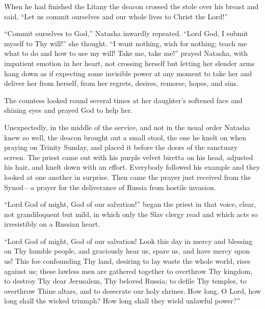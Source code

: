 When he had finished the Litany the deacon crossed the stole over
his breast and said, ``Let us commit ourselves and our whole
lives to Christ the Lord!''

``Commit ourselves to God,'' Natasha inwardly repeated. ``Lord
God, I submit myself to Thy will!'' she thought. ``I want
nothing, wish for nothing; teach me what to do and how to use my
will! Take me, take me!''  prayed Natasha, with impatient emotion
in her heart, not crossing herself but letting her slender arms
hang down as if expecting some invisible power at any moment to
take her and deliver her from herself, from her regrets, desires,
remorse, hopes, and sins.

The countess looked round several times at her daughter's
softened face and shining eyes and prayed God to help her.

Unexpectedly, in the middle of the service, and not in the usual
order Natasha knew so well, the deacon brought out a small stool,
the one he knelt on when praying on Trinity Sunday, and placed it
before the doors of the sanctuary screen. The priest came out
with his purple velvet biretta on his head, adjusted his hair,
and knelt down with an effort.  Everybody followed his example
and they looked at one another in surprise. Then came the prayer
just received from the Synod---a prayer for the deliverance of
Russia from hostile invasion.

``Lord God of might, God of our salvation!'' began the priest in
that voice, clear, not grandiloquent but mild, in which only the
Slav clergy read and which acts so irresistibly on a Russian
heart.

``Lord God of might, God of our salvation! Look this day in mercy
and blessing on Thy humble people, and graciously hear us, spare
us, and have mercy upon us! This foe confounding Thy land,
desiring to lay waste the whole world, rises against us; these
lawless men are gathered together to overthrow Thy kingdom, to
destroy Thy dear Jerusalem, Thy beloved Russia; to defile Thy
temples, to overthrow Thine altars, and to desecrate our holy
shrines. How long, O Lord, how long shall the wicked triumph? How
long shall they wield unlawful power?''

